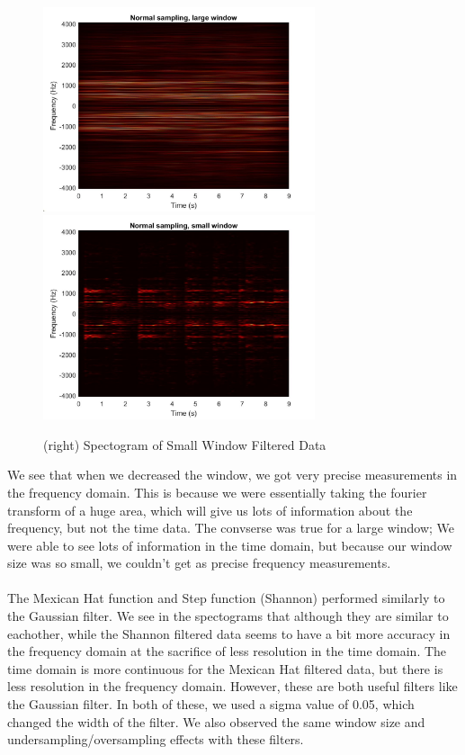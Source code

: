 \documentclass{article}
\begin{document}
\begin{figure}[h]
\begin{center}
\includegraphics[width = 8cm]{largewindow}
\includegraphics[width = 8cm]{smallwindow}
\caption{\label{fig:scaled_diss} (left) Spectogram of Large Window Filtered Data}
\caption{\label{fig:scaled_diss} (right) Spectogram of Small Window Filtered Data}
\end{center}
\end{figure}
We see that when we decreased the window, we got very precise measurements in the frequency domain. This is because we were essentially taking the fourier transform of a huge area, which will give us lots of information about the frequency, but not the time data. The convserse was true for a large window; We were able to see lots of information in the time domain, but because our window size was so small, we couldn't get as precise frequency measurements. \\ \\
The Mexican Hat function and Step function (Shannon) performed similarly to the Gaussian filter. We see in the spectograms that although they are similar to eachother, while the Shannon filtered data seems to have a bit more accuracy in the frequency domain at the sacrifice of less resolution in the time domain. The time domain is more continuous for the Mexican Hat filtered data, but there is less resolution in the frequency domain. However, these are both useful filters like the Gaussian filter. In both of these, we used a sigma value of 0.05, which changed the width of the filter. We also observed the same window size and undersampling/oversampling effects with these filters.
\end{document}
